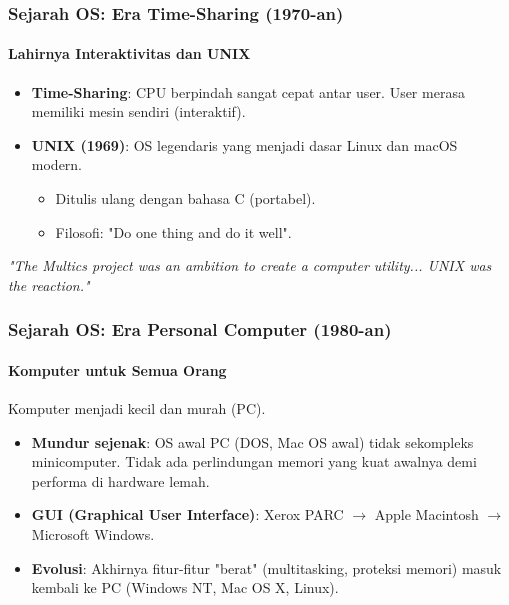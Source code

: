 \documentclass[t,aspectratio=169,xcolor=dvipsnames]{beamer}
\begin{document}
\begin{frame}[t]
    \frametitle{Sejarah OS: Era Time-Sharing (1970-an)}
    \framesubtitle{Lahirnya Interaktivitas dan UNIX}
    
    \begin{itemize}
        \item \textbf{Time-Sharing}: CPU berpindah sangat cepat antar user. User merasa memiliki mesin sendiri (interaktif).
        \item \textbf{UNIX (1969)}: OS legendaris yang menjadi dasar Linux dan macOS modern.
            \begin{itemize}
                \item Ditulis ulang dengan bahasa C (portabel).
                \item Filosofi: "Do one thing and do it well".
            \end{itemize}
    \end{itemize}
    
    \vspace{0.2cm}
    \textit{"The Multics project was an ambition to create a computer utility... UNIX was the reaction."}
\end{frame}

\begin{frame}[t]
    \frametitle{Sejarah OS: Era Personal Computer (1980-an)}
    \framesubtitle{Komputer untuk Semua Orang}
    
    Komputer menjadi kecil dan murah (PC).
    
    \begin{itemize}
        \item \textbf{Mundur sejenak}: OS awal PC (DOS, Mac OS awal) tidak sekompleks minicomputer. Tidak ada perlindungan memori yang kuat awalnya demi performa di hardware lemah.
        \item \textbf{GUI (Graphical User Interface)}: Xerox PARC $\rightarrow$ Apple Macintosh $\rightarrow$ Microsoft Windows.
        \item \textbf{Evolusi}: Akhirnya fitur-fitur "berat" (multitasking, proteksi memori) masuk kembali ke PC (Windows NT, Mac OS X, Linux).
    \end{itemize}
\end{frame}
\end{document}
